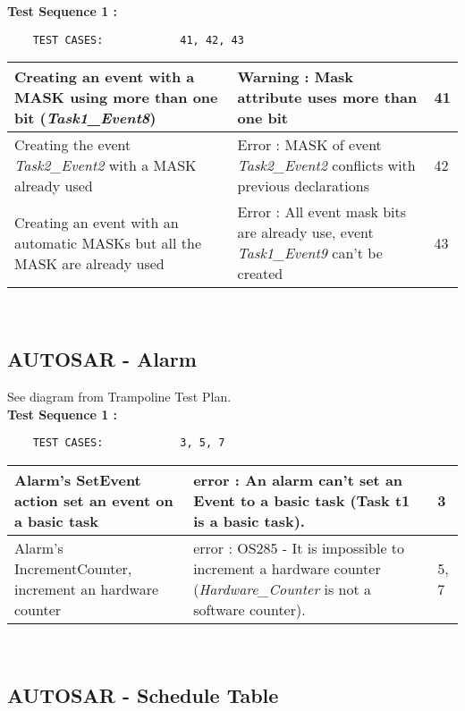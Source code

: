 \documentclass[10pt]{article}
\newlength{\Li}\settowidth{\Li}{Running}
\newlength{\Lii}\setlength{\Lii}{7cm}
\newlength{\Liiii}\setlength{\Liiii}{0.9cm}
\newlength{\Liii}\setlength{\Liii}{\textwidth} \addtolength{\Liii}{-\Li} \addtolength{\Liii}{-\Lii} \addtolength{\Liii}{-\Liiii}
\begin{document}
	\textbf{Test Sequence 1 :}
	\begin{lstlisting}
	TEST CASES:		       41, 42, 43
	\end{lstlisting}
	
	

	\begin{supertabular}{|p{\Li}|p{\Lii}|p{\Liii}|} \hline 
	Creating an event with a MASK using more than one bit (\textit{Task1\_Event8})	& Warning : Mask attribute uses more than one bit									& 41 \\ \hline
	Creating the event \textit{Task2\_Event2} with a MASK already used			& Error : MASK of event \textit{Task2\_Event2} conflicts with previous declarations 			& 42 \\ \hline
	Creating an event with an automatic MASKs but all the MASK are already used	& Error : All event mask bits are already use, event \textit{Task1\_Event9} can't be created	& 43 \\ \hline
	\end{supertabular}\\


\subsection{AUTOSAR - Alarm}

	See diagram from Trampoline Test Plan.\\
	
	\textbf{Test Sequence 1 :}
	\begin{lstlisting}
	TEST CASES:		       3, 5, 7
	\end{lstlisting}
	

	\begin{supertabular}{|p{\Li}|p{\Lii}|p{\Liii}|} \hline 
	Alarm's SetEvent action set an event on a basic task 			& error : An alarm can't set an Event to a basic task (Task t1 is a basic task).											& 3 \\ \hline
	Alarm's IncrementCounter, increment an hardware counter		& error : OS285 - It is impossible to increment a hardware counter (\textit{Hardware\_Counter} is not a software counter).		& 5, 7 \\ \hline
	\end{supertabular}\\
		
\subsection{AUTOSAR - Schedule Table}
	
\end{document}
